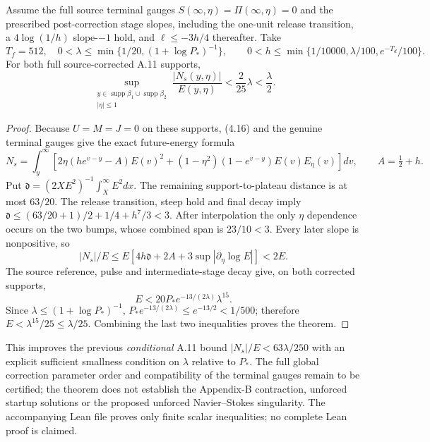 \begin{theorem}
\label{thm:A11-support-strong-20261021}
Assume the full source terminal gauges
$S(\infty,\eta)=\Pi(\infty,\eta)=0$ and the prescribed
post-correction stage slopes, including the one-unit
release transition, a $4\log(1/h)$ slope-$-1$ hold,
and $\ell\le-3h/4$ thereafter. Take
\[
 T_f=512,\quad0<\lambda\le
 \min\{1/20,(1+\log P_*)^{-1}\},\qquad
 0<h\le\min\{1/10000,\lambda/100,e^{-T_d}/100\}.
\]
For both full source-corrected A.11 supports,
\begin{equation}\label{eq:A11-strong-support-cone-20261021}
\sup_{\substack{y\in\operatorname{supp}\beta_1
 \cup\operatorname{supp}\beta_2\\|\eta|\le1}}
  \frac{|N_s(y,\eta)|}{E(y,\eta)}
 <\frac{2}{25}\lambda<\frac\lambda2.
\end{equation}
\end{theorem}
\begin{proof}
Because $U=M=J=0$ on these supports, (4.16) and the
genuine terminal gauges give the exact future-energy formula
\[
 N_s=\int_y^\infty\left[
 2\eta(he^{v-y}-A)E(v)^2+
 (1-\eta^2)(1-e^{v-y})E(v)E_\eta(v)\right]dv,
 \qquad A=\tfrac12+h.
\]
Put $\mathfrak d=(2XE^2)^{-1}\int_X^\infty E^2dx$.
The remaining support-to-plateau distance is at most $63/20$.
The release transition, steep hold and final decay imply
$\mathfrak d\le(63/20+1)/2+1/4+h^7/3<3$.
After interpolation the only $\eta$ dependence occurs on the
two bumps, whose combined span is $23/10<3$.
Every later slope is nonpositive, so
\[
 |N_s|/E\le E[4h\mathfrak d+2A+
 3\sup|\partial_\eta\log E|]<2E.
\]
The source reference, pulse and intermediate-stage decay
give, on both corrected supports,
\[
 E<20P_*e^{-13/(2\lambda)}\lambda^{15}.
\]
Since $\lambda\le(1+\log P_*)^{-1}$,
$P_*e^{-13/(2\lambda)}\le e^{-13/2}<1/500$;
therefore $E<\lambda^{15}/25\le\lambda/25$.
Combining the last two inequalities proves the theorem.
\end{proof}

This improves the previous \emph{conditional} A.11 bound
$|N_s|/E<63\lambda/250$ with an explicit sufficient
smallness condition on $\lambda$ relative to $P_*$.
The full global correction parameter order and compatibility
of the terminal gauges remain to be certified; the theorem
does not establish the Appendix-B contraction, unforced
startup solutions or the proposed unforced Navier--Stokes
singularity. The accompanying Lean file proves only finite
scalar inequalities; no complete Lean proof is claimed.
